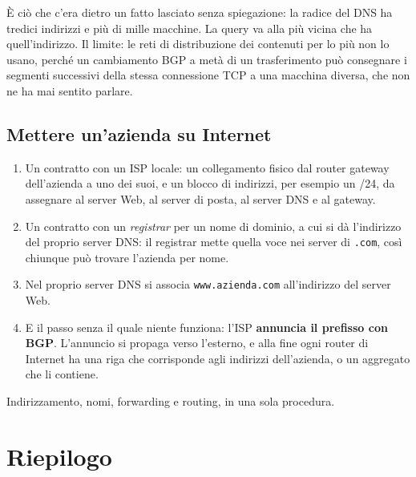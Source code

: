 È ciò che c'era dietro un fatto lasciato senza spiegazione: la radice del DNS ha tredici indirizzi e più di mille macchine. La query
va alla più vicina che ha quell'indirizzo. Il limite: le reti di distribuzione dei contenuti per lo più non lo usano, perché un
cambiamento BGP a metà di un trasferimento può consegnare i segmenti successivi della stessa connessione TCP a una macchina diversa,
che non ne ha mai sentito parlare.

\subsection{Mettere un'azienda su Internet}

\begin{enumerate}
    \item Un contratto con un ISP locale: un collegamento fisico dal router gateway dell'azienda a uno dei suoi, e un blocco di
          indirizzi, per esempio un /24, da assegnare al server Web, al server di posta, al server DNS e al gateway.
    \item Un contratto con un \emph{registrar} per un nome di dominio, a cui si dà l'indirizzo del proprio server DNS: il registrar
          mette quella voce nei server di \texttt{.com}, così chiunque può trovare l'azienda per nome.
    \item Nel proprio server DNS si associa \texttt{www.azienda.com} all'indirizzo del server Web.
    \item E il passo senza il quale niente funziona: l'ISP \textbf{annuncia il prefisso con BGP}. L'annuncio si propaga verso
          l'esterno, e alla fine ogni router di Internet ha una riga che corrisponde agli indirizzi dell'azienda, o un aggregato che
          li contiene.
\end{enumerate}
Indirizzamento, nomi, forwarding e routing, in una sola procedura.

\section{Riepilogo}

